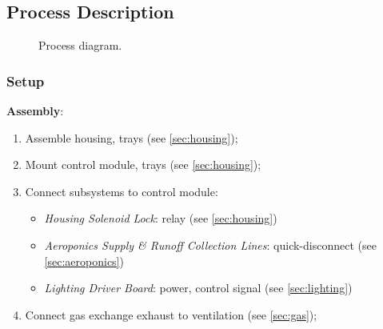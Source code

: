  \subsection{Process Description}
\label{sec:process}

\begin{figure}[h!]
    \centering
    \caption{Process diagram.}
    \label{fig:process}
\end{figure}

\clearpage

\subsubsection{Setup}
\label{sec:process_setup}

\textbf{Assembly}:
\begin{enumerate}
    \item Assemble housing, trays (see \ref{sec:housing});
    \item Mount control module, trays (see \ref{sec:housing});
    \item Connect subsystems to control module:
    \begin{itemize}
        \item \textit{Housing Solenoid Lock}: relay (see \ref{sec:housing})
        \item \textit{Aeroponics Supply \& Runoff Collection Lines}: quick-disconnect (see \ref{sec:aeroponics})
        \item \textit{Lighting Driver Board}: power, control signal (see \ref{sec:lighting})
    \end{itemize}
    \item Connect gas exchange exhaust to ventilation (see \ref{sec:gas});
\end{enumerate}

